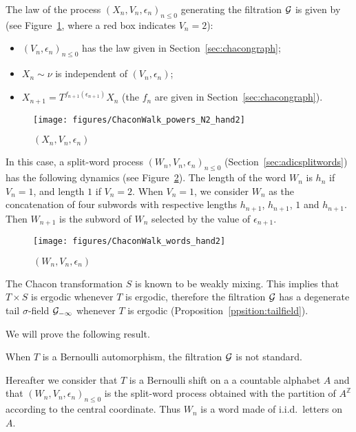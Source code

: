 \documentclass[12pt,a4paper]{article}
\begin{document}
The law of the process ${(X_n, V_n, \epsilon_n)}_{n \leq 0}$ generating the 
filtration $\mathcal{G}$ is given by (see Figure~\ref{fig:ChaconPowers}, where a red box 
indicates $V_n=2$):

\begin{itemize}
\item ${(V_n, \epsilon_n)}_{n \leq 0}$ has the law given in Section~\ref{sec:chacongraph};

\item $X_n \sim \nu$ is independent of $(V_n, \epsilon_n)$;

\item $X_{n+1} = T^{f_{n+1}(\epsilon_{n+1})}X_n$ (the $f_n$ are given in Section~\ref{sec:chacongraph}).
\end{itemize}

\begin{figure}[!h]
\centering
	\texttt{[image: figures/ChaconWalk\_powers\_N2\_hand2]}
\caption{$(X_n, V_n, \epsilon_n)$}
\label{fig:ChaconPowers}
\end{figure}


In this case, a split-word process ${(W_n, V_n, \epsilon_n)}_{n \leq 0}$ 
(Section~\ref{sec:adicsplitwords})  
has the following dynamics (see Figure~\ref{fig:ChaconSplitWord}). 
The length of the word $W_n$ is $h_n$ if $V_n=1$, and length $1$ if $V_n=2$. 
When $V_n=1$, we consider $W_n$ as the concatenation of four subwords 
with respective lengths $h_{n+1}$, $h_{n+1}$, $1$ and $h_{n+1}$. 
Then $W_{n+1}$ is the subword of $W_n$ selected by the value of $\epsilon_{n+1}$. 

\begin{figure}[!h]
\centering
	\texttt{[image: figures/ChaconWalk\_words\_hand2]}
\caption{$(W_n, V_n, \epsilon_n)$}
\label{fig:ChaconSplitWord}
\end{figure}

The Chacon transformation $S$ is known to be weakly mixing. 
This implies that $T \times S$ is ergodic whenever $T$ is ergodic, 
therefore the filtration $\mathcal{G}$ has a degenerate tail $\sigma$-field 
$\mathcal{G}_{-\infty}$ whenever $T$ is ergodic (Proposition~\ref{ppsition:tailfield}). 

We will prove the following result.

\begin{ppsition}\label{ppsition:ChaconNonStandard}
When $T$ is a Bernoulli automorphism, the filtration $\mathcal{G}$ is not standard.
\end{ppsition}

Hereafter we consider that $T$ is a Bernoulli shift on a 
a countable alphabet $A$ and that  ${(W_n, V_n, \epsilon_n)}_{n \leq 0}$ 
is the split-word process obtained with the partition of 
$A^{\mathbb{Z}}$ according to the central coordinate. 
Thus $W_n$ is a word made of i.i.d.\ letters on $A$. 
\end{document}
